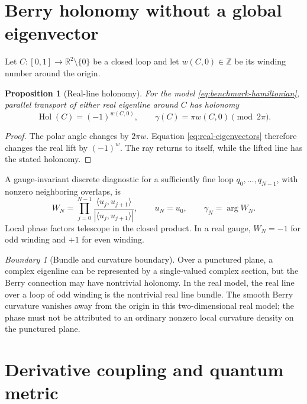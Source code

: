 \documentclass[11pt,a4paper]{article}
\theoremstyle{definition}
\theoremstyle{plain}
\newtheorem{proposition}[definition]{Proposition}
\theoremstyle{remark}
\newtheorem{warning}[definition]{Boundary}
\newcommand{\R}{\mathbb{R}}
\newcommand{\abs}[1]{\left\lvert #1\right\rvert}
\begin{document}
\section{Berry holonomy without a global eigenvector}

Let \(C:[0,1]\to\R^2\setminus\{0\}\) be a closed loop and let
\(w(C,0)\in\mathbb Z\) be its winding number around the origin.

\begin{proposition}[Real-line holonomy]\label{prop:berry-holonomy}
For the model \cref{eq:benchmark-hamiltonian}, parallel transport of
either real eigenline around \(C\) has holonomy
\begin{equation}\label{eq:berry-phase}
\operatorname{Hol}(C)=(-1)^{w(C,0)},\qquad
\gamma(C)=\pi w(C,0)\pmod{2\pi}.
\end{equation}
\end{proposition}

\begin{proof}
The polar angle changes by \(2\pi w\). Equation
\cref{eq:real-eigenvectors} therefore changes the real lift by
\((-1)^w\). The ray returns to itself, while the lifted line has the
stated holonomy.
\end{proof}

A gauge-invariant discrete diagnostic for a sufficiently fine loop
\(q_0,\ldots,q_{N-1}\), with nonzero neighboring overlaps, is
\begin{equation}\label{eq:discrete-wilson-loop}
W_N=\prod_{j=0}^{N-1}
\frac{\langle u_j,u_{j+1}\rangle}
{\abs{\langle u_j,u_{j+1}\rangle}},
\qquad u_N=u_0,\qquad
\gamma_N=\arg W_N.
\end{equation}
Local phase factors telescope in the closed product.  In a real gauge,
\(W_N=-1\) for odd winding and \(+1\) for even winding.

\begin{warning}[Bundle and curvature boundary]
Over a punctured plane, a complex eigenline can be represented by a
single-valued complex section, but the Berry connection may have
nontrivial holonomy. In the real model, the real line over a loop of
odd winding is the nontrivial real line bundle. The smooth Berry
curvature vanishes away from the origin in this two-dimensional real
model; the phase must not be attributed to an ordinary nonzero local
curvature density on the punctured plane.
\end{warning}

\section{Derivative coupling and quantum metric}
\end{document}
